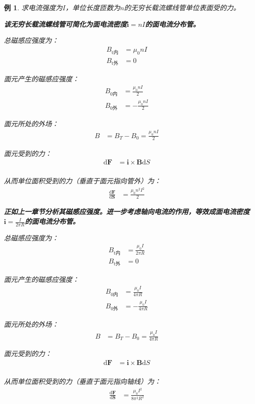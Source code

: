 \documentclass[12pt,onecolumn,a4paper]{book}
\newtheorem*{example}{例}
\numberwithin{table}{subsection}
\numberwithin{equation}{subsection}
\begin{document}
\begin{example}
    求电流强度为$I$，单位长度匝数为$n$的无穷长载流螺线管单位表面受的力。

    \textbf{该无穷长载流螺线管可简化为面电流密度$\mathbf{i}=nI$的面电流分布管。}

    总磁感应强度为：
    \begin{align}
        B_\text{t内} & = \mu_0 n I \\
        B_\text{t外} & = 0
    \end{align}

    面元产生的磁感应强度：
    \begin{align}
        B_\text{0内} & = \frac{\mu_0 n I}{2}  \\
        B_\text{0外} & = -\frac{\mu_0 n I}{2}
    \end{align}

    面元所处的外场：
    \begin{align}
        B & = B_T - B_0 =\frac{\mu_0 n I}{2}
    \end{align}

    面元受到的力：
    \begin{align}
        \mathrm{d} \mathbf{F} & = \mathbf{i} \times \mathbf{B} \mathrm{d}S \\
    \end{align}

    从而单位面积受到的力（垂直于面元指向管外）为：
    \begin{align}
        \frac{\mathrm{d} \mathbf{F}}{\mathrm{d} \mathbf{S}} & = \frac{\mu_0 n^2 I^2}{2}
    \end{align}

    \textbf{正如上一章节分析其磁感应强度。进一步考虑轴向电流的作用，等效成面电流密度$\mathbf{i}=\frac{I}{2\pi R}$的面电流分布管。}

    总磁感应强度为：
    \begin{align}
        B_\text{t内} & = \frac{\mu_0 I}{2\pi R} \\
        B_\text{t外} & = 0
    \end{align}

    面元产生的磁感应强度：
    \begin{align}
        B_\text{0内} & = \frac{\mu_0 I}{4\pi R}  \\
        B_\text{0外} & = -\frac{\mu_0 I}{4\pi R}
    \end{align}

    面元所处的外场：
    \begin{align}
        B & = B_T - B_0 =\frac{\mu_0 I}{4\pi R}
    \end{align}

    面元受到的力：
    \begin{align}
        \mathrm{d} \mathbf{F} & = \mathbf{i} \times \mathbf{B} \mathrm{d}S \\
    \end{align}

    从而单位面积受到的力（垂直于面元指向轴线）为：
    \begin{align}
        \frac{\mathrm{d} \mathbf{F}}{\mathrm{d} \mathbf{S}} & = \frac{\mu_0 I^2}{8 \pi^2R^2}
    \end{align}
\end{example}
\end{document}
